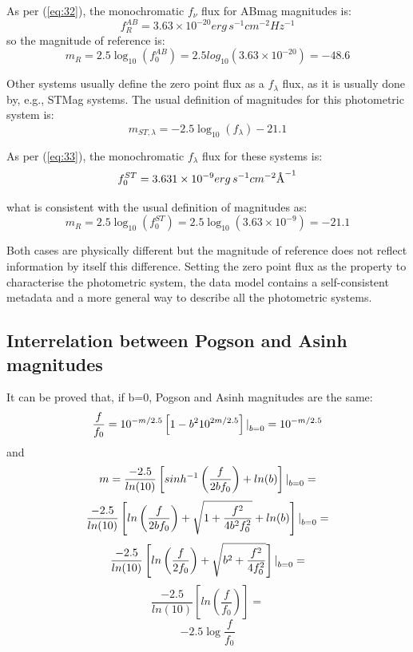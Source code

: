 \documentclass[11pt,a4paper]{ivoa}
\newcommand{\angstrom}{\mbox{\normalfont\AA}}
\begin{document}
\begin{appendices}
As per (\ref{eq:32}), the monochromatic $f_\nu $ flux for ABmag magnitudes is:
\begin{equation} \label{eq:38}
f_{R}^{AB}=3.63 \times 10^{-20} erg\, s^{-1} cm^{-2} Hz^{-1}
\end{equation}
so the magnitude of reference is:
\begin{equation} \label{eq:39}
m_R = 2.5\log_{10} (f_{0}^{AB})=2.5 log_10(3.63\times 10^{-20})=-48.6
\end{equation}

Other systems usually define the zero point flux as a $f_\lambda $ flux, as
it is usually done by, e.g., STMag systems. The usual definition of magnitudes for this photometric system is:
\begin{equation} \label{eq:40}
m_{ST,\lambda }=-2.5\log_{10} (f_\lambda )-21.1
\end{equation}

As per (\ref{eq:33}), the monochromatic
$f_\lambda $ flux for these systems is:
\begin{equation} \label{eq:41}
f_0 ^{ST} = 3.631 \times 10^{-9} erg\, s^{-1} cm^{-2} \angstrom ^{-1}
\end{equation}

what is consistent with the usual definition of magnitudes as:
\begin{equation} \label{eq:42}
m_R =2.5\log_{10} (f_0 ^{ST})=2.5\log_{10} (3.63\times 10^{-9})=-21.1
\end{equation}
\par
Both cases are physically different but the magnitude of reference does not
reflect information by itself this difference. Setting the zero point flux as the
property to characterise the photometric system, the data model contains a 
self-consistent metadata and a more general way to describe all the photometric
systems.

\subsection{Interrelation between Pogson and Asinh magnitudes}
It can be proved that, if b=0, Pogson and Asinh magnitudes are the same:
\begin{equation} \label{eq:43}
\frac{f}{f_0}=10^{-m/2.5}\left[ 1-b^2 10^{2m/2.5}\right] \text{\textbar}_{b=0} =10^{-m/2.5}
\end{equation}
and
\begin{equation} \label{eq:44}
m=\frac{-2.5}{ln(10)}\left[ sinh^{-1} \left(\frac{f}{2bf_0}\right) + ln(b)\right] \text{\textbar}_{b=0} =
\end{equation}
\[
\frac{-2.5}{ln(10)}\left[ ln\left(\frac{f}{2bf_0}\right) + \sqrt{1+\frac{f^2}{4b^2 f_0^2}} + ln(b)\right] \text{\textbar}_{b=0} =
\]
\[
\frac{-2.5}{ln(10)}\left[ ln\left(\frac{f}{2f_0}\right) + \sqrt{b^2+\frac{f^2}{4 f_0^2}}\right] \text{\textbar}_{b=0} =
\]
\[
\frac{-2.5}{ln(10)}\left[ ln(\frac{f}{f_0}) \right] =
\]
\[
-2.5\log{\frac{f}{f_0}}
\]



\end{appendices}
\end{document}
